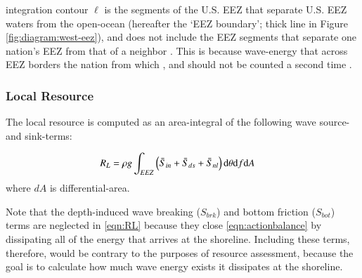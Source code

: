 \DIFdelbegin {}\DIFdelend \DIFaddbegin {}\DIFaddend integration contour $\ell$ is the segments of the U.S. EEZ that separate U.S. EEZ waters from the open-ocean (hereafter the `EEZ boundary'; thick \DIFdelbegin {}\DIFdelend \DIFaddbegin {}\DIFaddend line in Figure \ref{fig:diagram:west-eez}), and does not include the EEZ segments that separate one nation's EEZ from that of a neighbor \citep[]{flandersmarineinstituteMaritimeBoundariesGeodatabase2018}. This is because wave-energy that \DIFdelbegin {}\DIFdelend \DIFaddbegin {}\DIFaddend across EEZ borders \DIFdelbegin {}\DIFdelend \DIFaddbegin {}\DIFaddend the nation from which \DIFdelbegin {}\DIFdelend \DIFaddbegin {}\DIFaddend , and should not be counted a second time \DIFdelbegin {}\DIFdelend \DIFaddbegin {}\DIFaddend .

\subsubsection{Local Resource} \label{sec:method:calc:local}

The local resource \DIFdelbegin {}\DIFdelend is computed as an area-integral of the following wave source- and sink-terms:

\begin{align}
  R_L &= \rho g \int_{EEZ}\relax \left ( \bar{S}_{in} + \bar{S}_{ds} + \bar{S}_{nl} \right ) \mathrm{d} \theta \mathrm{d} f \mathrm{d} A
\label{eqn:RL}
\end{align}
where $dA$ is differential-area.
\DIFdelbegin {}\DIFdelend 

Note that the depth-induced wave breaking ($S_{brk}$) and bottom friction ($S_{bot}$) terms are neglected in \eqref{eqn:RL} because they close \eqref{eqn:actionbalance} by dissipating all of the energy that arrives at the shoreline. Including these terms, therefore, would be contrary to the purposes of resource assessment, because the goal is to calculate how much wave energy exists \DIFdelbegin {}\DIFdelend \DIFaddbegin \textit{} \DIFaddend it dissipates at the shoreline\DIFdelbegin {}\DIFdelend .

